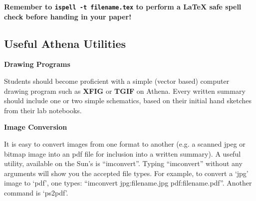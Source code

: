     {\bf Remember to {\tt ispell -t filename.tex} to perform a \LaTeX
    safe spell check before handing in your paper!}
    
    \subsection{Useful
    Athena Utilities} {\bf Drawing Programs}
    
    Students should become proficient with a simple (vector based)
    computer drawing program such as {\bf XFIG} or {\bf TGIF} on Athena.
    Every written summary should include one or two simple schematics,
    based on their initial hand sketches from their lab notebooks.
    
    {\bf Image Conversion}
    
    It is easy to  convert images from one format to another (e.g. a
    scanned jpeg or bitmap image into an pdf file for inclusion into a
    written summary).  A useful utility, available on the Sun's is
    ``imconvert''. Typing ``imconvert'' without any arguments will show
    you the accepted file types.  For example, to convert a `jpg' image
    to `pdf', one types: ``imconvert jpg:filename.jpg
    pdf:filename.pdf''.  Another command is `ps2pdf'.  
    
    
    
    
    
